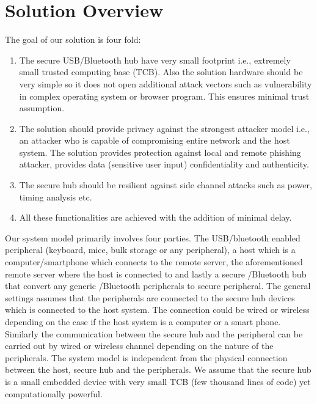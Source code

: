 \section{Solution Overview}
\label{sec:solutionoverview}


The goal of our solution is four fold:
\begin{enumerate}
  \item The secure USB/Bluetooth hub have very small footprint i.e., extremely   small trusted computing base (TCB). Also the solution hardware should be very simple so it does not open additional attack vectors such as vulnerability in complex operating system or browser program. This ensures minimal trust assumption.
  
  \item The solution should provide privacy against the strongest attacker model i.e., an attacker who is capable of compromising entire network and the host system. The solution provides protection against local and remote phishing attacker, provides data (sensitive user input) confidentiality and authenticity.
 
  \item The secure hub should be resilient against side channel attacks such as power, timing analysis etc. 
  
  \item All these functionalities are achieved with the addition of minimal delay.

\end{enumerate}

Our system model primarily involves four parties. The USB/bluetooth enabled peripheral (keyboard, mice, bulk storage or any peripheral), a host which is a computer/smartphone which connects to the remote server, the aforementioned remote server where the host is connected to and lastly a secure \usb/Bluetooth bub that convert any generic \usb/Bluetooth peripherals to secure peripheral. The general settings assumes that the peripherals are connected to the secure hub devices which is connected to the host system. The connection could be wired or wireless depending on the case if the host system is a computer or a smart phone. Similarly the communication between the secure hub and the peripheral can be carried out by wired or wireless channel depending on the nature of the peripherals. The system model is independent from the physical connection between the host, secure hub and the peripherals. We assume that the secure hub is a small embedded device with very small TCB (few thousand lines of code) yet computationally powerful.




